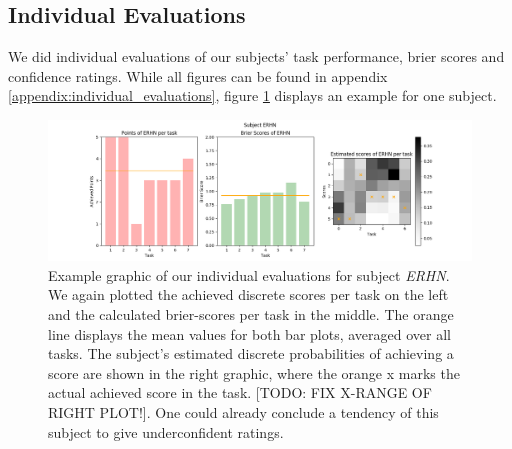 \documentclass[../main/main.tex]{subfiles}
\begin{document}
\subsection{Individual Evaluations}
We did individual evaluations of our subjects' task performance, brier scores and confidence ratings. While all figures can be found in appendix \ref{appendix:individual_evaluations}, figure \ref{fig:erhn_results} displays an example for one subject.
\begin{figure}[H]
	\centering
	\captionsetup{justification=centering}
	\includegraphics[width=\textwidth]{../assets/ERHN_results.png}
	\caption{Example graphic of our individual evaluations for subject \textit{ERHN}. We again plotted the achieved discrete scores per task on the left and the calculated brier-scores per task in the middle. The orange line displays the mean values for both bar plots, averaged over all tasks. The subject's estimated discrete probabilities of achieving a score are shown in the right graphic, where the orange x marks the actual achieved score in the task. [TODO: FIX X-RANGE OF RIGHT PLOT!]. One could already conclude a tendency of this subject to give underconfident ratings.}
	\label{fig:erhn_results} 
\end{figure}
\end{document}
